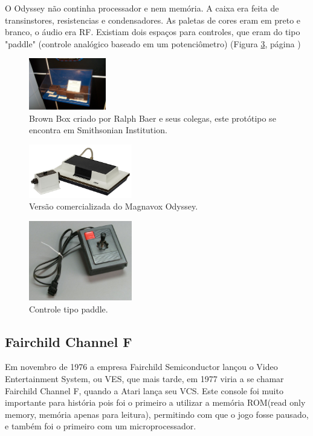 \documentclass[12pt]{article}
\begin{document}
O Odyssey não continha processador e nem memória. A caixa era feita de transinstores, resistencias e condensadores. As paletas de cores eram em preto e branco, o áudio era RF. Existiam dois espaços para controles, que eram do tipo "paddle" (controle analógico baseado em um potenciômetro) (Figura \ref{fig:controle}, página \pageref{fig:controle})
\begin{figure}[!htb]
    \centering
    \includegraphics[width=0.3\textwidth]{prototipo.jpg}
    \caption{Brown Box criado por Ralph Baer e seus colegas, este protótipo se encontra em Smithsonian Institution.}
    \label{fig:prototipo}
\end{figure}
\begin{figure}[!htb]
    \centering
    \includegraphics[width=0.4\textwidth]{magna.jpg}
    \caption{Vers\~{a}o comercializada do Magnavox Odyssey.}
    \label{fig:magna}
\end{figure}
\begin{figure}[!htb]
    \centering
    \includegraphics[width=0.4\textwidth]{controlemag.jpg}
    \caption{Controle tipo paddle.}
    \label{fig:controle}
\end{figure}
\newpage
\subsection{Fairchild Channel F}
Em novembro de 1976 a empresa Fairchild Semiconductor lançou o Video Entertainment System, ou VES, que mais tarde, em 1977 viria a se chamar  Fairchild Channel F, quando a Atari lança seu VCS. Este console foi muito importante para história pois foi o primeiro a utilizar a memória ROM(read only memory, memória apenas para leitura), permitindo com que o jogo fosse pausado, e também foi o primeiro com um microprocessador. 
\end{document}
